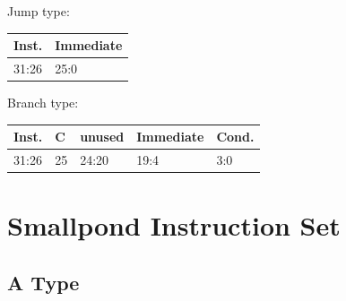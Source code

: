 \documentclass[12pt]{article}
\begin{document}
        \begin{center}
            Jump type:\\
            \vspace{1em}
            \begin{tabular}{ |p{1.8cm}|p{10.7cm}| }
                \hline
                \textbf{Inst.} & \textbf{Immediate}\\
                \hline
                31:26& 25:0\\
                \hline
            \end{tabular}
        \end{center}
        
        \begin{center}
            Branch type:\\
            \vspace{1em}
            \begin{tabular}{|p{1.8cm}|p{.3cm}|p{1.1cm}|p{6.5cm}|p{1.5cm}| }
                \hline
                \textbf{Inst.} & \textbf{C} & unused &\textbf{Immediate}&\textbf{Cond.}\\
                \hline
                31:26& 25 & 24:20 &19:4 &3:0\\
                \hline
            \end{tabular}
        \end{center}
    
\newpage



\newpage
\section{Smallpond Instruction Set}
    \subsection{A Type}
    
    
    
\end{document}

